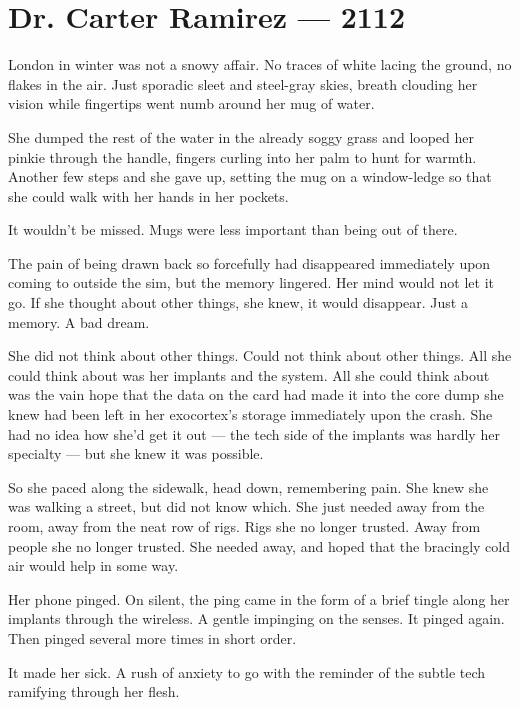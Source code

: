 \hypertarget{dr-carter-ramirez-2112}{%
\chapter*{Dr. Carter Ramirez — 2112}\label{dr-carter-ramirez-2112}}

London in winter was not a snowy affair. No traces of white lacing the ground, no flakes in the air. Just sporadic sleet and steel-gray skies, breath clouding her vision while fingertips went numb around her mug of water.

She dumped the rest of the water in the already soggy grass and looped her pinkie through the handle, fingers curling into her palm to hunt for warmth. Another few steps and she gave up, setting the mug on a window-ledge so that she could walk with her hands in her pockets.

It wouldn't be missed. Mugs were less important than being out of there.

The pain of being drawn back so forcefully had disappeared immediately upon coming to outside the sim, but the memory lingered. Her mind would not let it go. If she thought about other things, she knew, it would disappear. Just a memory. A bad dream.

She did not think about other things. Could not think about other things. All she could think about was her implants and the system. All she could think about was the vain hope that the data on the card had made it into the core dump she knew had been left in her exocortex's storage immediately upon the crash. She had no idea how she'd get it out — the tech side of the implants was hardly her specialty — but she knew it was possible.

So she paced along the sidewalk, head down, remembering pain. She knew she was walking a street, but did not know which. She just needed away from the room, away from the neat row of rigs. Rigs she no longer trusted. Away from people she no longer trusted. She needed away, and hoped that the bracingly cold air would help in some way.

Her phone pinged. On silent, the ping came in the form of a brief tingle along her implants through the wireless. A gentle impinging on the senses. It pinged again. Then pinged several more times in short order.

It made her sick. A rush of anxiety to go with the reminder of the subtle tech ramifying through her flesh.

